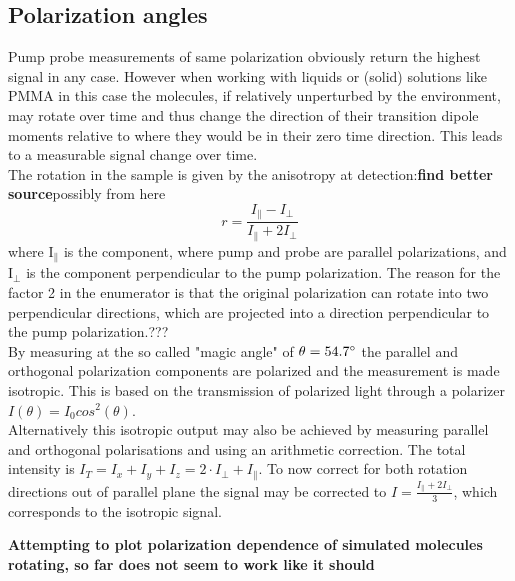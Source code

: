 \documentclass[twoside,openright]{scrreprt}
\begin{document}
\subsection{Polarization angles}
Pump probe measurements of same polarization obviously return the highest signal in any case. However when working with liquids or (solid) solutions like PMMA in this case the molecules, if relatively unperturbed by the environment, may rotate over time and thus change the direction of their transition dipole moments relative to where they would be in their zero time direction. This leads to a measurable signal change over time.\\
The rotation in the sample is given by the anisotropy at detection:\textbf{find better source}possibly from here\cite{Schalk2010}
\begin{equation*}
r = \frac{I_{\parallel}-I_{\perp}}{I_{\parallel}+2I_{\perp}}
\end{equation*}
where $\mathrm{I_\parallel}$ is the component, where pump and probe are parallel polarizations, and $\mathrm{I_\perp}$ is the component perpendicular to the pump polarization. The reason for the factor 2 in the enumerator is that the original polarization can rotate into two perpendicular directions, which are projected into a direction perpendicular to the pump polarization.???\\
By measuring at the so called "magic angle" of $\theta = 54.7 \degree$ the parallel and orthogonal polarization components are polarized and the measurement is made isotropic. This is based on the transmission of polarized light through a polarizer $I(\theta) = I_0 cos^2(\theta)$.\\
Alternatively this isotropic output may also be achieved by measuring parallel and orthogonal polarisations and using an arithmetic correction. The total intensity is $I_T = I_x+I_y+I_z = 2\cdot I_\perp + I_\parallel$. To now correct for both rotation directions out of parallel plane the signal may be corrected to $I = \frac{I_\parallel + 2I_\perp}{3}$, which corresponds to the isotropic signal.\cite{Zheng2020}

\textbf{Attempting to plot polarization dependence of simulated molecules rotating, so far does not seem to work like it should}

\end{document}
